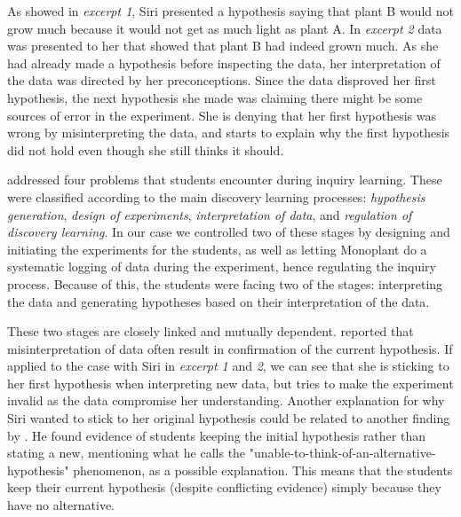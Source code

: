 As showed in \emph{excerpt 1}, Siri presented a hypothesis saying that plant B would not grow much because it would not get as much light as plant A. In \emph{excerpt 2} data was presented to her that showed that plant B had indeed grown much. As she had already made a hypothesis before inspecting the data, her interpretation of the data was directed by her preconceptions. Since the data disproved her first hypothesis, the next hypothesis she made was claiming there might be some sources of error in the experiment. She is denying that her first hypothesis was wrong by misinterpreting the data, and starts to explain why the first hypothesis did not hold even though she still thinks it should.

\citet{de1998scientific} addressed four problems that students encounter during inquiry learning. These were classified according to the main discovery learning processes: \textit{hypothesis generation}, \textit{design of experiments}, \textit{interpretation of data}, and \textit{regulation of discovery learning}. In our case we controlled two of these stages by designing and initiating the experiments for the students, as well as letting Monoplant do a systematic logging of data during the experiment, hence regulating the inquiry process. Because of this, the students were facing two of the stages: interpreting the data and generating hypotheses based on their interpretation of the data. 

These two stages are closely linked and mutually dependent. \citeauthor*{klahr1993heuristics} \citetext{\citeyear{klahr1993heuristics}, referenced in \citealp{de1998scientific}} reported that misinterpretation of data often result in confirmation of the current hypothesis. If applied to the case with Siri in \emph{excerpt 1} and \emph{2}, we can see that she is sticking to her first hypothesis when interpreting new data, but tries to make the experiment invalid as the data compromise her understanding. Another explanation for why Siri wanted to stick to her original hypothesis could be related to another finding by \citeauthor*{dunbar1993concept} \citetext{\citeyear{dunbar1993concept}, referenced in \citealp{de1998scientific}}. He found evidence of students keeping the initial hypothesis rather than stating a new, mentioning what he calls the "unable-to-think-of-an-alternative-hypothesis" phenomenon, as a possible explanation. This means that the students keep their current hypothesis (despite conflicting evidence) simply because they have no alternative.

